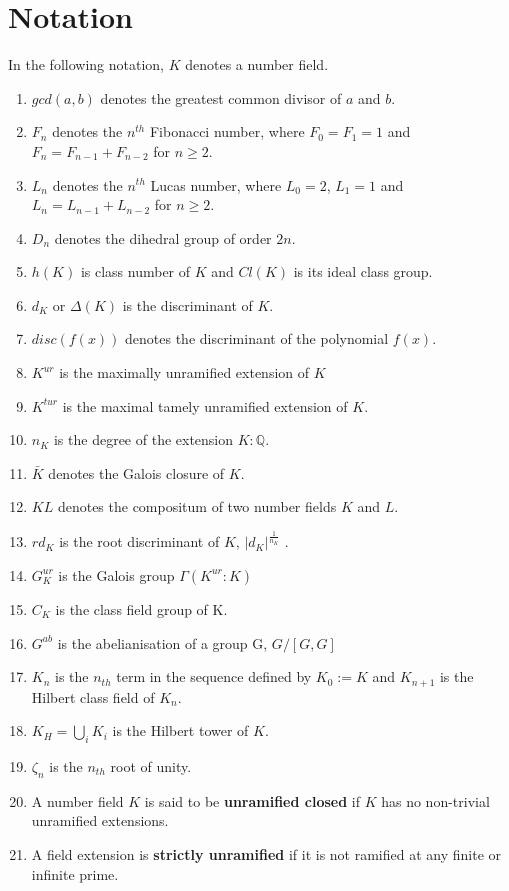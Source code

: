 \documentclass[12pt]{extarticle}
\newcommand{\Q}{\mathbb{Q}}
\newcommand{\<}{\langle}
\renewcommand{\>}{\rangle}
\theoremstyle{definition}
\begin{document}
\section{Notation}
In the following notation, $K$ denotes a number field.
\begin{enumerate}
    \item $gcd(a,b)$ denotes the greatest common divisor of $a$ and $b$.
    \item $F_n$ denotes the $n^{th}$ Fibonacci number, where 
    $F_0 = F_1 = 1$ and $F_{n} = F_{n-1} + F_{n-2}$ for $n \geq 2$.
    \item $L_n$ denotes the $n^{th}$ Lucas number, where 
    $L_0 = 2$, $L_1 = 1$ and $L_{n} = L_{n-1} + L_{n-2}$ for $n \geq 2$.
    \item $D_n$ denotes the dihedral group of order $2n$. 
    \item $h(K)$ is class number of $K$ and $Cl(K)$ is its ideal class group.
    \item $d_K$ or $\Delta(K)$ is the discriminant of $K$.
    \item $disc(f(x))$ denotes the discriminant of the polynomial $f(x)$.
    \item $K^{ur}$ is the maximally unramified extension of $K$
    \item $K^{tur}$ is the maximal tamely unramified extension of $K$.
    \item $n_K$ is the degree of the extension $K:\Q$.
    \item $\bar{K}$ denotes the Galois closure of $K$.
    \item $KL$ denotes the compositum of two number fields $K$ and $L$.
    \item $rd_K$ is the root discriminant of $K$, $|d_K|^\frac{1}{n_K}$ .
    \item $G_K^{ur}$ is the Galois group $\Gamma(K^{ur}:K)$
    \item $C_K$ is the class field group of K. 
    \item $G^{ab}$ is the abelianisation of a group G, $G/[G,G]$
    \item $K_n$ is the $n_{th}$ term in the sequence defined by $K_0:=K$ and $K_{n+1}$ is the Hilbert class field of $K_n$.
    \item $K_H=\bigcup_{i}K_{i}$ is the Hilbert tower of $K$.  
    \item $\zeta_n$ is the $n_{th}$ root of unity. 
    \item A number field $K$ is said to be \textbf{unramified closed} if $K$ has no non-trivial unramified extensions. 
    \item A field extension is \textbf{strictly unramified} if it is not ramified at any finite or infinite prime.

\end{enumerate}
\end{document}
